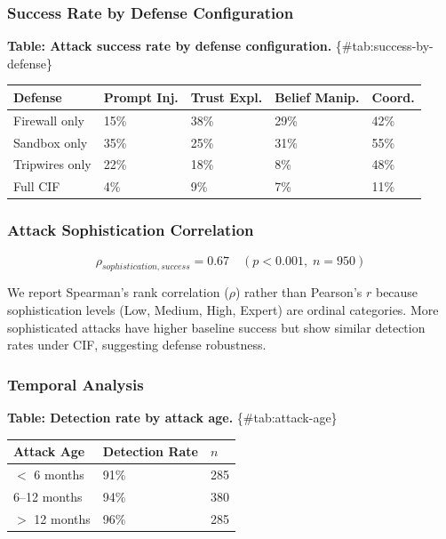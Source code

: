\documentclass[
]{article}
\newcounter{none} %
\begin{document}
\subsubsection{Success Rate by Defense
Configuration}\label{sec:success-by-defense}

\textbf{Table: Attack success rate by defense configuration.}
\{\#tab:success-by-defense\}

{\def\LTcaptype{none} %
\begin{longtable}[]{@{}lllll@{}}
\toprule\noalign{}
Defense & Prompt Inj. & Trust Expl. & Belief Manip. & Coord. \\
\midrule\noalign{}
\endhead
\bottomrule\noalign{}
\endlastfoot
Firewall only & 15\% & 38\% & 29\% & 42\% \\
Sandbox only & 35\% & 25\% & 31\% & 55\% \\
Tripwires only & 22\% & 18\% & 8\% & 48\% \\
Full CIF & 4\% & 9\% & 7\% & 11\% \\
\end{longtable}
}

\subsubsection{Attack Sophistication
Correlation}\label{sec:sophistication-corr}

\begin{equation}
\label{eq:sophistication-correlation}
\rho_{sophistication, success} = 0.67 \quad (p < 0.001, \; n = 950)
\end{equation}

We report Spearman's rank correlation (\(\rho\)) rather than Pearson's
\(r\) because sophistication levels (Low, Medium, High, Expert) are
ordinal categories. More sophisticated attacks have higher baseline
success but show similar detection rates under CIF, suggesting defense
robustness.

\subsubsection{Temporal Analysis}\label{sec:temporal-analysis}

\textbf{Table: Detection rate by attack age.} \{\#tab:attack-age\}

{\def\LTcaptype{none} %
\begin{longtable}[]{@{}lll@{}}
\toprule\noalign{}
Attack Age & Detection Rate & \(n\) \\
\midrule\noalign{}
\endhead
\bottomrule\noalign{}
\endlastfoot
\(<\) 6 months & 91\% & 285 \\
6--12 months & 94\% & 380 \\
\(>\) 12 months & 96\% & 285 \\
\end{longtable}
}
\end{document}
